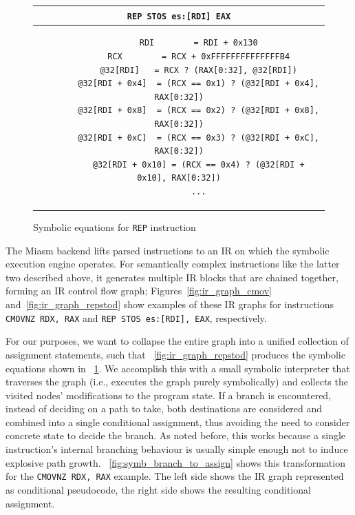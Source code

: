 \begin{figure}[htbp]
    \centering
    \begin{tabular}{c}
    \texttt{REP STOS es:[RDI] EAX} \\
    \midrule
    \begin{lstlisting}
        RDI        = RDI + 0x130
        RCX        = RCX + 0xFFFFFFFFFFFFFFB4
        @32[RDI]   = RCX ? (RAX[0:32], @32[RDI])
        @32[RDI + 0x4]  = (RCX == 0x1) ? (@32[RDI + 0x4],  RAX[0:32])
        @32[RDI + 0x8]  = (RCX == 0x2) ? (@32[RDI + 0x8],  RAX[0:32])
        @32[RDI + 0xC]  = (RCX == 0x3) ? (@32[RDI + 0xC],  RAX[0:32])
        @32[RDI + 0x10] = (RCX == 0x4) ? (@32[RDI + 0x10], RAX[0:32])
        ...
    \end{lstlisting}
    \end{tabular}
    \caption[]{Symbolic equations for \texttt{REP} instruction}\label{fig:symb_equation_loop}
\end{figure}

The Miasm backend lifts parsed instructions to an \ac{IR} on which the symbolic execution engine operates. For
semantically complex instructions like the latter two described above, it generates multiple \ac{IR} blocks that are
chained together, forming an \ac{IR} control flow graph; Figures~\ref{fig:ir_graph_cmov} and~\ref{fig:ir_graph_repstod}
show examples of these IR graphs for instructions \texttt{CMOVNZ RDX, RAX} and \texttt{REP STOS es:[RDI], EAX},
respectively.

For our purposes, we want to collapse the entire graph into a unified collection of assignment statements, such that
\figurename~\ref{fig:ir_graph_repstod} produces the symbolic equations shown in
\figurename~\ref{fig:symb_equation_loop}. We accomplish this with a small symbolic interpreter that traverses the graph
(i.e., executes the graph purely symbolically) and collects the visited nodes' modifications to the program state. If a
branch is encountered, instead of deciding on a path to take, both destinations are considered and combined into a
single conditional assignment, thus avoiding the need to consider concrete state to decide the branch. As noted before,
this works because a single instruction's internal branching behaviour is usually simple enough not to induce explosive
path growth.  \figurename~\ref{fig:symb_branch_to_assign} shows this transformation for the \texttt{CMOVNZ RDX, RAX}
example. The left side shows the IR graph represented as conditional pseudocode, the right side shows the resulting
conditional assignment.

